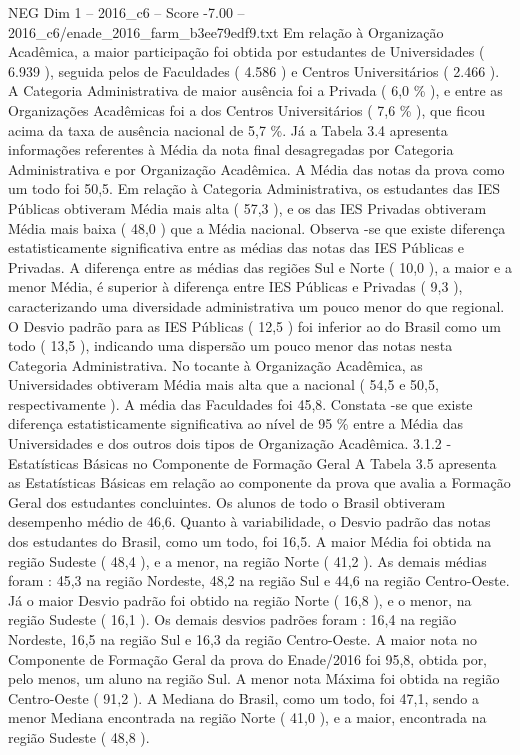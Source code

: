 \begin{textsample}{NEG Dim 1 – 2016\_c6 – Score -7.00 – 2016\_c6/enade\_2016\_farm\_b3ee79edf9.txt}
Em relação à Organização Acadêmica, a maior participação foi obtida por estudantes de Universidades ( 6.939 ), seguida pelos de Faculdades ( 4.586 ) e Centros Universitários ( 2.466 ).
A Categoria Administrativa de maior ausência foi a Privada ( 6,0 \% ), e entre as Organizações Acadêmicas foi a dos Centros Universitários ( 7,6 \% ), que ficou acima da taxa de ausência nacional de 5,7 \%.
Já a Tabela 3.4 apresenta informações referentes à Média da nota final desagregadas por Categoria Administrativa e por Organização Acadêmica.
A Média das notas da prova como um todo foi 50,5.
Em relação à Categoria Administrativa, os estudantes das IES Públicas obtiveram Média mais alta ( 57,3 ), e os das IES Privadas obtiveram Média mais baixa ( 48,0 ) que a Média nacional.
Observa -se que existe diferença estatisticamente significativa entre as médias das notas das IES Públicas e Privadas.
A diferença entre as médias das regiões Sul e Norte ( 10,0 ), a maior e a menor Média, é superior à diferença entre IES Públicas e Privadas ( 9,3 ), caracterizando uma diversidade administrativa um pouco menor do que regional.
O Desvio padrão para as IES Públicas ( 12,5 ) foi inferior ao do Brasil como um todo ( 13,5 ), indicando uma dispersão um pouco menor das notas nesta Categoria Administrativa.
No tocante à Organização Acadêmica, as Universidades obtiveram Média mais alta que a nacional ( 54,5 e 50,5, respectivamente ).
A média das Faculdades foi 45,8.
Constata -se que existe diferença estatisticamente significativa ao nível de 95 \% entre a Média das Universidades e dos outros dois tipos de Organização Acadêmica. 3.1.2 - Estatísticas Básicas no Componente de Formação Geral A Tabela 3.5 apresenta as Estatísticas Básicas em relação ao componente da prova que avalia a Formação Geral dos estudantes concluintes.
Os alunos de todo o Brasil obtiveram desempenho médio de 46,6.
Quanto à variabilidade, o Desvio padrão das notas dos estudantes do Brasil, como um todo, foi 16,5.
A maior Média foi obtida na região Sudeste ( 48,4 ), e a menor, na região Norte ( 41,2 ).
As demais médias foram : 45,3 na região Nordeste, 48,2 na região Sul e 44,6 na região Centro-Oeste.
Já o maior Desvio padrão foi obtido na região Norte ( 16,8 ), e o menor, na região Sudeste ( 16,1 ).
Os demais desvios padrões foram : 16,4 na região Nordeste, 16,5 na região Sul e 16,3 da região Centro-Oeste.
A maior nota no Componente de Formação Geral da prova do Enade/2016 foi 95,8, obtida por, pelo menos, um aluno na região Sul.
A menor nota Máxima foi obtida na região Centro-Oeste ( 91,2 ).
A Mediana do Brasil, como um todo, foi 47,1, sendo a menor Mediana encontrada na região Norte ( 41,0 ), e a maior, encontrada na região Sudeste ( 48,8 ).

\end{textsample}
